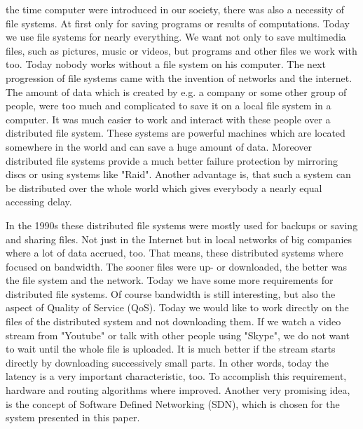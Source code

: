  the time computer were introduced in our society, there was also a necessity of file systems. At first only for saving programs or results of computations. Today we use file systems for nearly everything. We want not only to save multimedia files, such as pictures, music or videos, but programs and other files we work with too. Today nobody works without a file system on his computer. The next progression of file systems came with the invention of networks and the internet. The amount of data which is created by e.g. a company or some other group of people, were too much and complicated to save it on a local file system in a computer. It was much easier to work and interact with these people over a distributed file system. These systems are powerful machines which are located somewhere in the world and can save a huge amount of data. Moreover distributed file systems provide a much better failure protection by mirroring discs or using systems like "Raid". Another advantage is, that such a system can be distributed over the whole world which gives everybody a nearly equal accessing delay.

In the 1990s these distributed file systems were mostly used for backups or saving and sharing files. Not just in the Internet but in local networks of big companies where a lot of data accrued, too. That means, these distributed systems where focused on bandwidth. The sooner files were up- or downloaded, the better was the file system and the network. Today we have some more requirements for distributed file systems. Of course bandwidth is still interesting, but also the aspect of Quality of Service (QoS). Today we would like to work directly on the files of the distributed system and not downloading them. If we watch a video stream from "Youtube" or talk with other people using "Skype", we do not want to wait until the whole file is uploaded. It is much better if the stream starts directly by downloading successively small parts. In other words, today the latency is a very important characteristic, too. To accomplish this requirement, hardware and routing algorithms where improved. Another very promising idea, is the concept of Software Defined Networking (SDN), which is chosen for the system presented in this paper.

